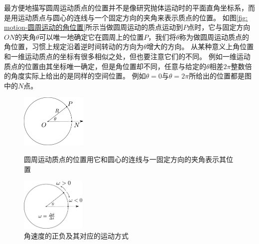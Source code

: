 最方便地描写圆周运动质点的位置并不是像研究抛体运动时的平面直角坐标系，而是用运动质点与圆心的连线与一个固定方向的夹角来表示质点的位置。
如图\ref{fig: motion-圆周运动的角位置}所示当做圆周运动的质点运动到$P$点时，它与固定方向$ON$的夹角$\theta$可以唯一地确定它在圆周上的位置$P$，我们将$\theta$称为做圆周运动质点的{\heiti 角位置}，习惯上规定沿着逆时间转动的方向为$\theta$增大的方向。
从某种意义上角位置和一维运动质点的坐标有很多相似之处，但也要注意它们的不同。
例如一维运动质点的位置由其坐标唯一确定，但是角位置却不同，任意与给定的$\theta$相差$2\pi$整数倍的角度实际上给出的是同样的空间位置。
例如$\theta =0$与$\theta = 2\pi$所给出的位置都是图中的$N$点。



\begin{figure}[hbtp]
\begin{minipage}[l]{0.5\textwidth}
\centering
\includegraphics[height=1in]{images/motion-14.pdf}
\caption{圆周运动质点的位置用它和圆心的连线与一固定方向的夹角表示其位置}
\label{fig: motion-圆周运动的角位置}
\end{minipage} 
\begin{minipage}[r]{0.5\textwidth}
\centering
\includegraphics[height=1in]{images/motion-15.pdf} 
\caption{角速度的正负及其对应的运动方式}
\label{fig: motion-角速度的正负及其对应的运动方式}
\end{minipage}
\end{figure}


